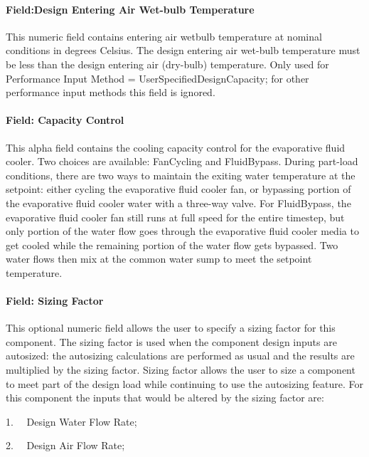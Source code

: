 \paragraph{Field:Design Entering Air Wet-bulb Temperature}\label{fielddesign-entering-air-wet-bulb-temperature}

This numeric field contains entering air wetbulb temperature at nominal conditions in degrees Celsius. The design entering air wet-bulb temperature must be less than the design entering air (dry-bulb) temperature. Only used for Performance Input Method = UserSpecifiedDesignCapacity; for other performance input methods this field is ignored.

\paragraph{Field: Capacity Control}\label{field-capacity-control}

This alpha field contains the cooling capacity control for the evaporative fluid cooler. Two choices are available: FanCycling and FluidBypass. During part-load conditions, there are two ways to maintain the exiting water temperature at the setpoint: either cycling the evaporative fluid cooler fan, or bypassing portion of the evaporative fluid cooler water with a three-way valve. For FluidBypass, the evaporative fluid cooler fan still runs at full speed for the entire timestep, but only portion of the water flow goes through the evaporative fluid cooler media to get cooled while the remaining portion of the water flow gets bypassed. Two water flows then mix at the common water sump to meet the setpoint temperature.

\paragraph{Field: Sizing Factor}\label{field-sizing-factor-3}

This optional numeric field allows the user to specify a sizing factor for this component. The sizing factor is used when the component design inputs are autosized: the autosizing calculations are performed as usual and the results are multiplied by the sizing factor. Sizing factor allows the user to size a component to meet part of the design load while continuing to use the autosizing feature. For this component the inputs that would be altered by the sizing factor are:

1.~~ Design Water Flow Rate;

2.~~ Design Air Flow Rate;

